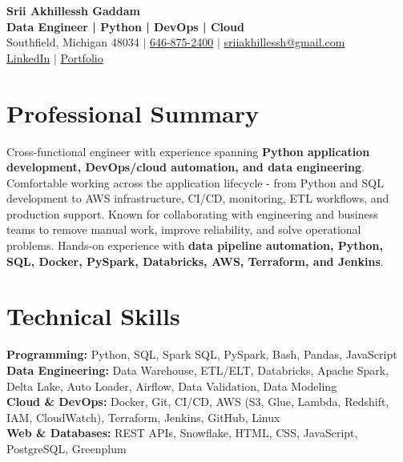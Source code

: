 \documentclass[letterpaper,10pt]{article}
\begin{document}
\fontsize{9.35pt}{10.45pt}\selectfont

\begin{center}
    {\LARGE \textbf{Srii Akhillessh Gaddam}} \\[-1pt]
    \textbf{Data Engineer | Python | DevOps | Cloud} \\[2pt]
    Southfield, Michigan 48034 $|$
    \href{tel:6468752400}{646-875-2400} $|$
    \href{mailto:sriiakhillessh@gmail.com}{sriiakhillessh@gmail.com} \\[1pt]
    \href{https://www.linkedin.com/in/srii-akhiilessh-gaddam-b48668191/}{LinkedIn} $|$
    \href{https://sriiakhillesshg.github.io/portfolio/}{Portfolio}
\end{center}
\vspace{-8pt}

\section{Professional Summary}
\small{Cross-functional engineer with experience spanning \textbf{Python application development, DevOps/cloud automation, and data engineering}. Comfortable working across the application lifecycle - from Python and SQL development to AWS infrastructure, CI/CD, monitoring, ETL workflows, and production support. Known for collaborating with engineering and business teams to remove manual work, improve reliability, and solve operational problems. Hands-on experience with \textbf{data pipeline automation, Python, SQL, Docker, PySpark, Databricks, AWS, Terraform, and Jenkins}.}

\section{Technical Skills}
\small{
\textbf{Programming:} Python, SQL, Spark SQL, PySpark, Bash, Pandas, JavaScript \\
\textbf{Data Engineering:} Data Warehouse, ETL/ELT, Databricks, Apache Spark, Delta Lake, Auto Loader, Airflow, Data Validation, Data Modeling \\
\textbf{Cloud \& DevOps:} Docker, Git, CI/CD, AWS (S3, Glue, Lambda, Redshift, IAM, CloudWatch), Terraform, Jenkins, GitHub, Linux \\
\textbf{Web \& Databases:} REST APIs, Snowflake, HTML, CSS, JavaScript, PostgreSQL, Greenplum
}
\end{document}
